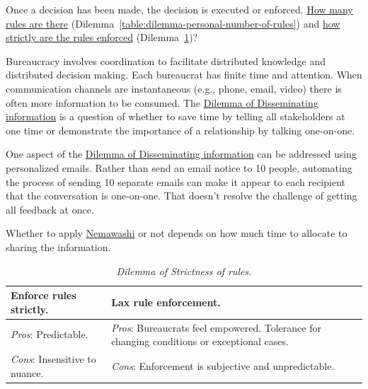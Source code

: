 Once a decision has been made, the decision is executed or enforced. \hyperref[table:dilemma-personal-number-of-rules]{How many rules are there} (Dilemma~\ref{table:dilemma-personal-number-of-rules}) and
\hyperref[table:dilemma-personal-rule-strictness-lax]{how strictly are the rules enforced} (Dilemma~\ref{table:dilemma-personal-rule-strictness-lax})?

Bureaucracy involves coordination to facilitate distributed knowledge and distributed decision making. Each bureaucrat has finite time and attention. When communication channels are instantaneous (e.g., phone, email, video) there is often more information to be consumed.
The \hyperref[table:dilemma-personal-disseminate-one-by-one]{Dilemma of Disseminating information} is a question of whether to save time by telling all stakeholders at one time or demonstrate the importance of a relationship by talking one-on-one. 


One aspect of the \hyperref[table:dilemma-personal-disseminate-one-by-one]{Dilemma of Disseminating information} can be addressed using personalized emails. Rather than send an email notice to 10 people, automating the process of sending 10 separate emails can make it appear to each recipient that the conversation is one-on-one.  That doesn't resolve the challenge of getting all feedback at once.

Whether to apply \href{https://en.wikipedia.org/wiki/Nemawashi}{Nemawashi} 
or not depends on how much time to allocate to sharing the information. 

\begin{center}
\begin{table}[H] %
\begin{tabular}{ | m{\dilemmatablewidth}| m{\dilemmatablewidth} | } 
  \hline
  \textbf{Enforce rules strictly.} & 
  \textbf{Lax rule enforcement.} \\ 
  \hline
  \textit{Pros}: Predictable. &
  \textit{Pros}: Bureaucrats feel empowered. Tolerance for changing conditions or exceptional cases. \\
  \hline
  \textit{Cons}: Insensitive to nuance. & 
  \textit{Cons}: Enforcement is subjective and unpredictable.  \\  
  \hline
\end{tabular}
\caption{
\textit{Dilemma of Strictness of rules.}
}
\label{table:dilemma-personal-rule-strictness-lax}
\end{table}
\end{center}

